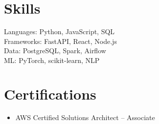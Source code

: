\documentclass[11pt,a4paper]{article}
\newcommand{\resumeItem}[1]{\item #1}
\begin{document}
\section*{Skills}
Languages: Python, JavaScript, SQL \\
Frameworks: FastAPI, React, Node.js \\
Data: PostgreSQL, Spark, Airflow \\
ML: PyTorch, scikit-learn, NLP

\section*{Certifications}
\begin{itemize}
  \resumeItem{AWS Certified Solutions Architect -- Associate}
\end{itemize}
\end{document}
